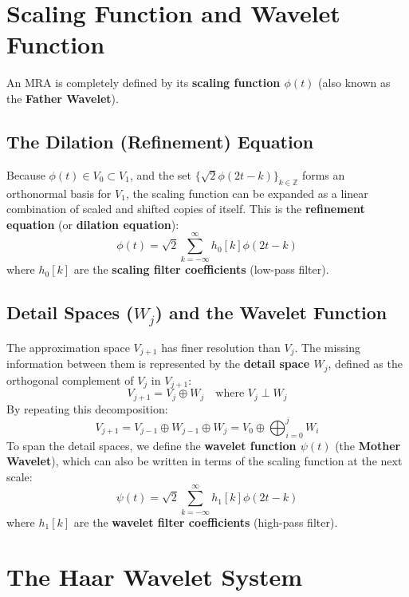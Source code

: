 \documentclass[12pt,a4paper]{article}
\begin{document}
\section{Scaling Function and Wavelet Function}

An MRA is completely defined by its \textbf{scaling function $\phi(t)$} (also known as the \textbf{Father Wavelet}).

\subsection{The Dilation (Refinement) Equation}
Because $\phi(t) \in V_0 \subset V_1$, and the set $\{\sqrt{2}\phi(2t-k)\}_{k\in\mathbb{Z}}$ forms an orthonormal basis for $V_1$, the scaling function can be expanded as a linear combination of scaled and shifted copies of itself. This is the \textbf{refinement equation} (or \textbf{dilation equation}):
$$\phi(t) = \sqrt{2} \sum_{k=-\infty}^{\infty} h_0[k] \phi(2t - k)$$
where $h_0[k]$ are the \textbf{scaling filter coefficients} (low-pass filter).

\subsection{Detail Spaces ($W_j$) and the Wavelet Function}
The approximation space $V_{j+1}$ has finer resolution than $V_j$. The missing information between them is represented by the \textbf{detail space $W_j$}, defined as the orthogonal complement of $V_j$ in $V_{j+1}$:
$$V_{j+1} = V_j \oplus W_j \quad \text{where } V_j \perp W_j$$
By repeating this decomposition:
$$V_{j+1} = V_{j-1} \oplus W_{j-1} \oplus W_j = V_0 \oplus \bigoplus_{i=0}^{j} W_i$$
To span the detail spaces, we define the \textbf{wavelet function $\psi(t)$} (the \textbf{Mother Wavelet}), which can also be written in terms of the scaling function at the next scale:
$$\psi(t) = \sqrt{2} \sum_{k=-\infty}^{\infty} h_1[k] \phi(2t - k)$$
where $h_1[k]$ are the \textbf{wavelet filter coefficients} (high-pass filter).

\section{The Haar Wavelet System}
\end{document}
